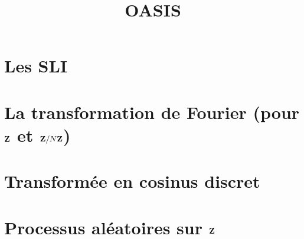 \documentclass[a4paper,9pt]{article}
\title{\vspace{-1.2cm} OASIS}
\date{}
\theoremstyle{persoth}%
\theoremstyle{persodef}
\theoremstyle{remark}
\begin{document}
\maketitle

\vspace{-1.5cm}

\section{Les SLI}

	

\section{La transformation de Fourier (pour $\mathbf{Z}$ et $\mathbf{Z} / N\mathbf{Z}$)}

	

\section{Transformée en cosinus discret}

	

\section{Processus aléatoires sur $\mathbf{Z}$}

	
\end{document}

